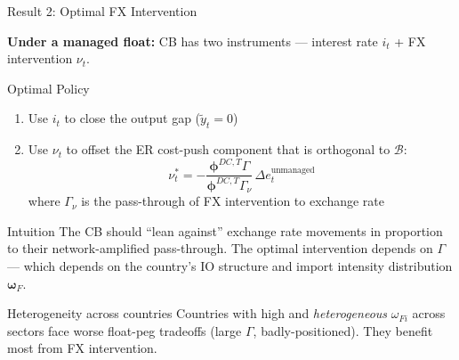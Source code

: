 \documentclass[aspectratio=169]{beamer}
\begin{document}
\begin{frame}{Result 2: Optimal FX Intervention}

\textbf{Under a managed float:} CB has two instruments --- interest rate $i_t$ + FX intervention $\nu_t$.

\begin{block}{Optimal Policy}
\begin{enumerate}
    \item Use $i_t$ to close the output gap ($\tilde{y}_t = 0$)
    \item Use $\nu_t$ to offset the ER cost-push component that is orthogonal to $\mathcal{B}$:
    \begin{equation*}
        \nu_t^* = -\frac{\bm{\phi}^{DC,T}\Gamma}{\bm{\phi}^{DC,T}\Gamma_\nu}\,\Delta e_t^{\text{unmanaged}}
    \end{equation*}
    where $\Gamma_\nu$ is the pass-through of FX intervention to exchange rate
\end{enumerate}
\end{block}

\begin{exampleblock}{Intuition}
The CB should ``lean against'' exchange rate movements in proportion to their network-amplified pass-through. The optimal intervention depends on $\Gamma$ --- which depends on the country's IO structure and import intensity distribution $\bm{\omega}_F$.
\end{exampleblock}

\begin{alertblock}{Heterogeneity across countries}
Countries with high and \textit{heterogeneous} $\omega_{Fi}$ across sectors face worse float-peg tradeoffs (large $\Gamma$, badly-positioned). They benefit most from FX intervention.
\end{alertblock}
\end{frame}
\end{document}

